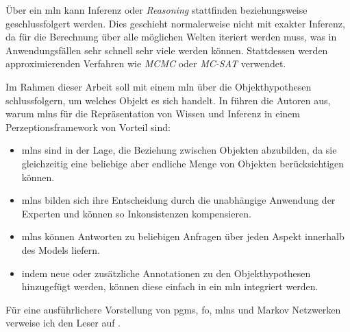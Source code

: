 Über ein \gls{mln} kann Inferenz oder \textit{Reasoning} stattfinden beziehungsweise geschlussfolgert werden. Dies geschieht normalerweise nicht mit exakter Inferenz, da für die Berechnung über alle möglichen Welten iteriert werden muss, was in Anwendungsfällen sehr schnell sehr viele werden können. Stattdessen werden approximierenden Verfahren wie \textit{MCMC} oder \textit{MC-SAT} verwendet. \cite{nyga17} \par  

Im Rahmen dieser Arbeit soll \robosherlock mit einem \gls{mln} über die Objekthypothesen schlussfolgern, um welches Objekt es sich handelt. In \cite{pr2looking} führen die Autoren aus, warum \glspl{mln} für die Repräsentation von Wissen und Inferenz in einem Perzeptionsframework von Vorteil sind: 
\begin{itemize}
	\item \glspl{mln} sind in der Lage, die Beziehung zwischen Objekten abzubilden, da sie gleichzeitig eine beliebige aber endliche Menge von Objekten berücksichtigen können.
	\item \glspl{mln} bilden sich ihre Entscheidung durch die unabhängige Anwendung der Experten und können so Inkonsistenzen kompensieren.
	\item \glspl{mln} können Antworten zu beliebigen Anfragen über jeden Aspekt innerhalb des Models liefern. 
	\item indem neue oder zusätzliche Annotationen zu den Objekthypothesen hinzugefügt werden, können diese einfach in ein \gls{mln} integriert werden.    
\end{itemize}   
Für eine ausführlichere Vorstellung von \glspl{pgm}, \gls{fo}, \glspl{mln} und Markov Netzwerken verweise ich den Leser auf \cite{jain, nyga17, mln}. \par 

